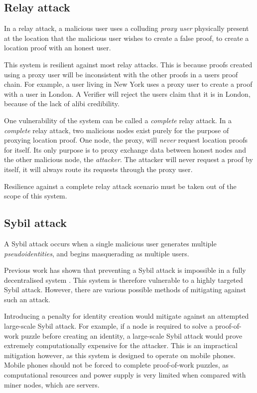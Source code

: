 \subsection{Relay attack}
In a relay attack, a malicious user uses a colluding \textit{proxy user} physically present at the location that the malicious user wishes to create a false proof, to create a location proof with an honest user.

This system is resilient against most relay attacks. This is because proofs created using a proxy user will be inconsistent with the other proofs in a users proof chain. For example, a user living in New York uses a proxy user to create a proof with a user in London. A Verifier will reject the users claim that it is in London, because of the lack of alibi credibility.

One vulnerability of the system can be called a \textit{complete} relay attack. In a \textit{complete} relay attack, two malicious nodes exist purely for the purpose of proxying location proof. One node, the proxy, will \textit{never} request location proofs for itself. Its only purpose is to proxy exchange data between honest nodes and the other malicious node, the \textit{attacker}. The attacker will never request a proof by itself, it will always route its requests through the proxy user.

Resilience against a complete relay attack scenario must be taken out of the scope of this system. 

\subsection{Sybil attack}
A Sybil attack occurs when a single malicious user generates multiple \textit{pseudoidentities}, and begins masquerading as multiple users.

Previous work has shown that preventing a Sybil attack is impossible in a fully decentralised system \cite{sybil}. This system is therefore vulnerable to a highly targeted Sybil attack. However, there are various possible methods of mitigating against such an attack.

Introducing a penalty for identity creation would mitigate against an attempted large-scale Sybil attack. For example, if a node is required to solve a proof-of-work puzzle before creating an identity, a large-scale Sybil attack would prove extremely computationally expensive for the attacker. This is an impractical mitigation however, as this system is designed to operate on mobile phones. Mobile phones should not be forced to complete proof-of-work puzzles, as computational resources and power supply is very limited when compared with miner nodes, which are servers.

